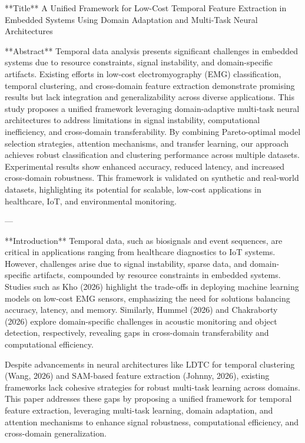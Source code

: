 **Title**  
A Unified Framework for Low-Cost Temporal Feature Extraction in Embedded Systems Using Domain Adaptation and Multi-Task Neural Architectures  

**Abstract**  
Temporal data analysis presents significant challenges in embedded systems due to resource constraints, signal instability, and domain-specific artifacts. Existing efforts in low-cost electromyography (EMG) classification, temporal clustering, and cross-domain feature extraction demonstrate promising results but lack integration and generalizability across diverse applications. This study proposes a unified framework leveraging domain-adaptive multi-task neural architectures to address limitations in signal instability, computational inefficiency, and cross-domain transferability. By combining Pareto-optimal model selection strategies, attention mechanisms, and transfer learning, our approach achieves robust classification and clustering performance across multiple datasets. Experimental results show enhanced accuracy, reduced latency, and increased cross-domain robustness. This framework is validated on synthetic and real-world datasets, highlighting its potential for scalable, low-cost applications in healthcare, IoT, and environmental monitoring.

---

**Introduction**  
Temporal data, such as biosignals and event sequences, are critical in applications ranging from healthcare diagnostics to IoT systems. However, challenges arise due to signal instability, sparse data, and domain-specific artifacts, compounded by resource constraints in embedded systems. Studies such as Kho (2026) highlight the trade-offs in deploying machine learning models on low-cost EMG sensors, emphasizing the need for solutions balancing accuracy, latency, and memory. Similarly, Hummel (2026) and Chakraborty (2026) explore domain-specific challenges in acoustic monitoring and object detection, respectively, revealing gaps in cross-domain transferability and computational efficiency.

Despite advancements in neural architectures like LDTC for temporal clustering (Wang, 2026) and SAM-based feature extraction (Johnny, 2026), existing frameworks lack cohesive strategies for robust multi-task learning across domains. This paper addresses these gaps by proposing a unified framework for temporal feature extraction, leveraging multi-task learning, domain adaptation, and attention mechanisms to enhance signal robustness, computational efficiency, and cross-domain generalization.

